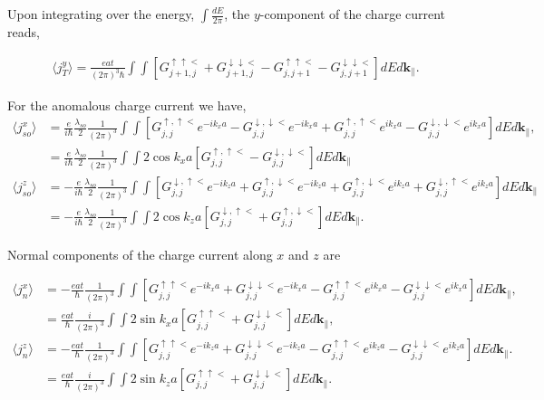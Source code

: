 \documentclass[10pt,prb,showpacs,amssymb,floatfix]{revtex4-1}
\newcommand{\dna}{\downarrow}
\newcommand{\nn}{\nonumber}
\newcommand{\para}{\parallel}
\newcommand{\upa}{\uparrow}
\begin{document}
Upon integrating over the energy, $\int \frac{dE}{2\pi}$,  the $y$-component of the charge current reads,

\begin{align}
\label{jojo0}
\langle j_T^y \rangle = \frac{eat}{(2\pi)^3\hbar} \int \int [   G_{j+1,j}^{\upa\upa <}  + G_{j+1,j}^{\dna\dna <} - G_{j,j+1}^{\upa\upa <} - G_{j,j+1}^{\dna\dna <}] dE d\bm k _\para.
\end{align}


For the anomalous charge current we have,
 \begin{align}
\langle j_{so}^x \rangle &=\frac{e}{i\hbar}\frac{\lambda_{so}}{2} \frac{1}{(2\pi)^3} \int \int [ G^{\upa,\upa <}_{j,j} e^{-ik_x a}- G^{\dna,\dna <}_{j,j}e^{-ik_x a}   + G^{\upa,\upa <}_{j,j} e^{ik_x a} - G^{\dna,\dna <}_{j,j}e^{ik_x a} ]  dE d\bm k _\para, \nn\\
&= \frac{e}{i\hbar}\frac{\lambda_{so}}{2} \frac{1}{(2\pi)^3} \int \int 2\cos k_x a [  G^{\upa,\upa <}_{j,j}  -  G^{\dna,\dna <}_{j,j}   ]  dE d\bm k _\para \\
\langle j_{so}^z\rangle &=-\frac{e}{i\hbar}\frac{\lambda_{so}}{2}\frac{1}{(2\pi)^3} \int \int [ G^{\dna,\upa <}_{j,j}e^{-ik_z a} + G^{\upa,\dna <}_{j,j}e^{-ik_z a} + G^{\upa,\dna <}_{j,j}e^{ik_z a} + G^{\dna,\upa <}_{j,j}e^{ik_z a} ] dE d\bm k _\para \nn\\
&= -\frac{e}{i\hbar}\frac{\lambda_{so}}{2}\frac{1}{(2\pi)^3} \int \int 2\cos k_z a [ G^{\dna,\upa <}_{j,j}+ G^{\upa,\dna <}_{j,j} ] dE d\bm k _\para.
\end{align}

Normal components of the charge current along $x$ and $z$ are

\begin{align}
\langle j_n^x \rangle &= -\frac{eat}{\hbar}\frac{1}{(2\pi)^3}\int\int[ G_{j,j}^{\upa\upa <}e^{-ik_x a}+ G_{j,j}^{\dna\dna <}e^{-ik_x a} - G_{j,j}^{\upa\upa <}e^{ik_x a}  - G_{j,j}^{\dna\dna <}e^{ik_x a}]dE d\bm k _\para, \nn\\
&= \frac{eat}{\hbar}\frac{i}{(2\pi)^3}\int\int2\sin k_x a [G_{j,j}^{\upa\upa <} + G_{j,j}^{\dna\dna <}]dE d\bm k _\para, \\
\langle j_n^z \rangle &=  -\frac{eat}{\hbar}\frac{1}{(2\pi)^3}\int\int[ G_{j,j}^{\upa\upa <}e^{-ik_z a}+ G_{j,j}^{\dna\dna <}e^{-ik_z a} - G_{j,j}^{\upa\upa <}e^{ik_z a}  - G_{j,j}^{\dna\dna <}e^{ik_z a}]dE d\bm k _\para. \nn\\
&= \frac{eat}{\hbar}\frac{i}{(2\pi)^3}\int\int 2\sin k_z a [ G_{j,j}^{\upa\upa <}+ G_{j,j}^{\dna\dna <}]dE d\bm k _\para.
\end{align}
\end{document}

